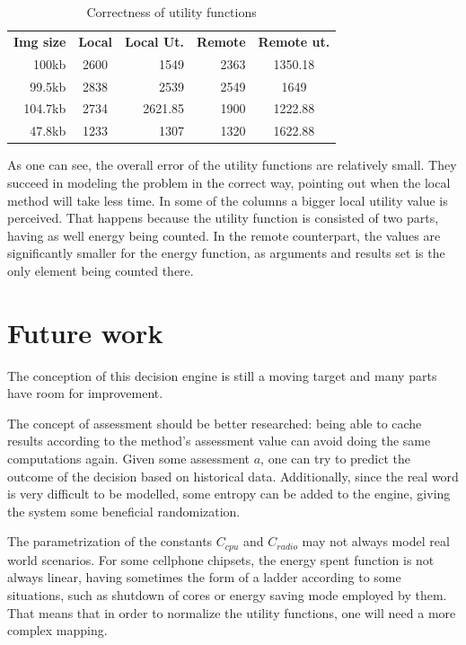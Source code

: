 \documentclass[10pt, conference, letterpaper]{IEEEtran}
\begin{document}
  \begin{table}[!t]
  \centering
  \caption{Correctness of utility functions}
  \label{table:correctness}
  \begin{tabular}{rcrrc}
    \textbf{ Img size } & \textbf{Local} & \textbf{Local Ut.} & \textbf{Remote} & \textbf{Remote ut.} \\
   100kb & 2600 & 1549 & 2363 & 1350.18 \\
   99.5kb & 2838  & 2539 & 2549 & 1649 \\
   104.7kb & 2734  & 2621.85 & 1900 & 1222.88 \\
   47.8kb & 1233  & 1307 & 1320 & 1622.88
  \end{tabular}
  \end{table}

  As one can see, the overall error of the utility functions are relatively small. They succeed in modeling the problem in the correct way, pointing out when the local method will take less time. In some of the columns a bigger local utility value is perceived. That happens because the utility function is consisted of two parts, having as well energy being counted. In the remote counterpart, the values are significantly smaller for the energy function, as arguments and results set is the only element being counted there.



  \section{Future work} \label{sec:futurework}

  The conception of this decision engine is still a moving target and many parts have room for improvement.

  The concept of assessment should be better researched: being able to cache results according to the method's assessment value can avoid doing the same computations again. Given some assessment $a$, one can try to predict the outcome of the decision based on historical data. Additionally, since the real word is very difficult to be modelled, some entropy can be added to the engine, giving the system some beneficial randomization.

  The parametrization of the constants $C_{cpu}$ and $C_{radio}$ may not always model real world scenarios. For some cellphone chipsets, the energy spent function is not always linear, having sometimes the form of a ladder according to some situations, such as shutdown of cores or energy saving mode employed by them. That means that in order to normalize the utility functions, one will need a more complex mapping.
\end{document}
